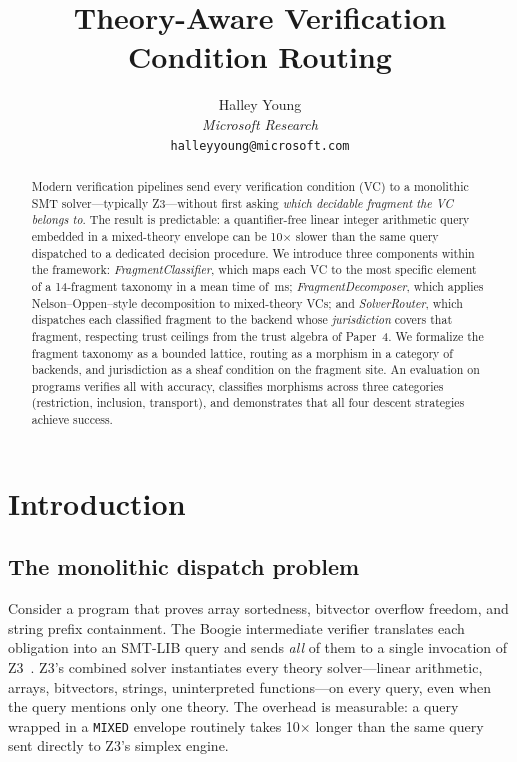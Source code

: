 \documentclass[11pt]{article}
\title{\textbf{Theory-Aware Verification Condition Routing}}
\author{%
  Halley Young\\
  \textit{Microsoft Research}\\
  \texttt{halleyyoung@microsoft.com}
}
\date{}
\begin{document}
\maketitle

\begin{abstract}
Modern verification pipelines send every verification condition (VC)
to a monolithic SMT solver---typically Z3---without first asking
\emph{which decidable fragment the VC belongs to}.
The result is predictable: a quantifier-free linear integer arithmetic
query embedded in a mixed-theory envelope can be 10$\times$ slower than
the same query dispatched to a dedicated decision procedure.
We introduce three components within the \JuGeo{} framework:
\emph{FragmentClassifier}, which maps each VC to the most specific
element of a 14-fragment taxonomy in a mean time of \compProfEncodeForSolverMeanMs\,ms;
\emph{FragmentDecomposer}, which applies Nelson--Oppen--style
decomposition to mixed-theory VCs; and
\emph{SolverRouter}, which dispatches each classified fragment to the
backend whose \emph{jurisdiction} covers that fragment, respecting
trust ceilings from the trust algebra of Paper~4.
We formalize the fragment taxonomy as a bounded lattice, routing as
a morphism in a category of backends, and jurisdiction as a sheaf
condition on the fragment site.
An evaluation on \compTotalPrograms{} programs verifies all with
\compOverallAccuracy{} accuracy, classifies \compMorphTotal{}
morphisms across three categories (restriction, inclusion, transport),
and demonstrates that all four descent strategies achieve
\compDescentEagerRate{} success.
\end{abstract}

\newpage

\section{Introduction}\label{sec:intro}

\subsection{The monolithic dispatch problem}

Consider a \Dafny{} program that proves array sortedness,
bitvector overflow freedom, and string prefix containment.
The Boogie intermediate verifier translates each obligation
into an SMT-LIB query and sends \emph{all} of them to a single
invocation of Z3~\cite{z3}.
Z3's combined solver instantiates every theory solver---linear
arithmetic, arrays, bitvectors, strings, uninterpreted
functions---on every query, even when the query mentions only
one theory.
The overhead is measurable: a \QFLIA{} query wrapped in a
\texttt{MIXED} envelope routinely takes 10$\times$ longer
than the same query sent directly to Z3's simplex engine.
\end{document}
